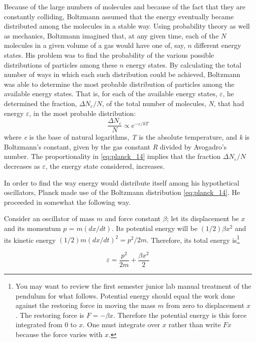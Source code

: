 Because of the large numbers of molecules and because of the fact that
they are constantly colliding, Boltzmann assumed that the energy
eventually became distributed among the molecules in a stable way. Using
probability theory as well as mechanics, Boltzmann imagined that, at any
given time, each of the $N$ molecules in a given volume of a gas would
have one of, say, $n$ different energy states. His problem was to
find the probability of the various possible distributions of particles
among these $n$ energy states. By calculating the total number of
ways in which each such distribution could be achieved, Boltzmann was
able to determine the most probable distribution of particles among the
available energy states. That is, for each of the available energy
states, $\varepsilon$, he determined the fraction,
$\Delta N_{\varepsilon}/N$, of the total number of molecules,
\emph{N,} that had energy $\varepsilon$, in the most probable distribution:
%
\begin{equation}\label{eq:planck_14}
\frac{\Delta N_{\varepsilon}}{N} \propto e^{-{\varepsilon}/kT} %
\end{equation}
%
where \emph{e} is the base of natural logarithms, \emph{T} is the
absolute temperature, and \emph{k} is Boltzmann's constant, given by the
gas constant \emph{R} divided by Avogadro's number. The proportionality
in \eqref{eq:planck_14} implies that the fraction $\Delta N_{\varepsilon}/N$
decreases as $\varepsilon$, the energy state considered, increases.

In order to find the way energy would distribute itself among his
hypothetical oscillators, Planck made use of the Boltzmann distribution
\eqref{eq:planck_14}. He proceeded in somewhat the following way.

Consider an oscillator of mass $m$ and force constant $\beta$; let
its displacement be $x$ and its momentum $p$ =
$m(dx/dt)$. Its potential energy will be
$(1/2)\beta x^2$ and its kinetic energy $(1/2)m(dx/dt)^{2} = p^{2}/2m$.
Therefore, its total energy is\footnote{You may want to review the
  first semester junior lab manual treatment of the pendulum for what
  follows. Potential energy should equal the work done against the
  restoring force in moving the mass $m$ from zero to displacement
  $x$. The restoring force is $F = - \beta x$. Therefore the
  potential energy is this force integrated from 0 to $x$. One must
  integrate over $x$ rather than write $Fx$ because the force
  varies with $x$.}

\begin{equation}\label{eq:planck_15}
\varepsilon = \frac{p^2}{2m} + \frac{\beta x^2}{2} %
\end{equation}

